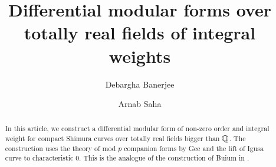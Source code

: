 \documentclass{amsart}
\numberwithin{equation}{section}
\def \mb{\mbox}
\newcommand{\ner}{\mb{\tiny Ner}}
\begin{document}
\newtheorem{thm}{Theorem}
\newtheorem{cor}[thm]{Corollary}
\newtheorem{conj}[thm]{Conjecture}
\newtheorem{quen}[thm]{Question}
\theoremstyle{definition}
\newtheorem{claim}[thm]{Claim}
\newtheorem{que}[thm]{Question}
\newtheorem{lem}[thm]{Lemma}
\def \vp{\varphi}
\newcommand{\wh}[1]{\widehat{#1}}
\newcommand{\pip}{\Pi}
\newcommand{\Xdag}{\widehat{X}_\dagger}



\theoremstyle{definition}
\newtheorem{dfn}{Definition}

\theoremstyle{remark}


\newcommand {\stk} {\stackrel}
\newcommand{\map}{\rightarrow}
\def \bX{{\bf X}}
\newcommand {\orho}{\overline{\rho}}

\newcommand{\hGm}{\wh{\G}_m}

\newcommand{\Ner}[1]{{#1}^{\ner}}
\newcommand{\red}[1]{{\color{red} #1}}
\newcommand{\blue}[1]{{\color{blue} #1}}




\theoremstyle{remark}
\newtheorem*{fact}{Fact}
\makeatletter
\def\imod#1{\allowbreak\mkern10mu({\operator@font mod}\,\,#1)}
\makeatother

\title{Differential  modular forms over totally real fields of 
integral weights}
\author{Debargha Banerjee}
\address{Indian Institute of Science Education and Research Pune, 
Dr. Homi Bhabha Road, Pashan, Pune 411 008, India}
\author{Arnab Saha}
\address{Indian Institute of Technology Gandhinagar, Palaj, 
Gandhinagar  382355, India}
\begin{abstract}
In this article, we construct a differential modular form of non-zero order
and integral weight for compact Shimura curves
over totally real fields bigger than $\mathbb{Q}$.  The construction uses the theory of 
mod $p$ companion forms by Gee and the lift of Igusa curve to characteristic 
0. This is the analogue of the  
construction of Buium in \cite{MR3349440}.  
\end{abstract}
\maketitle
\end{document}
